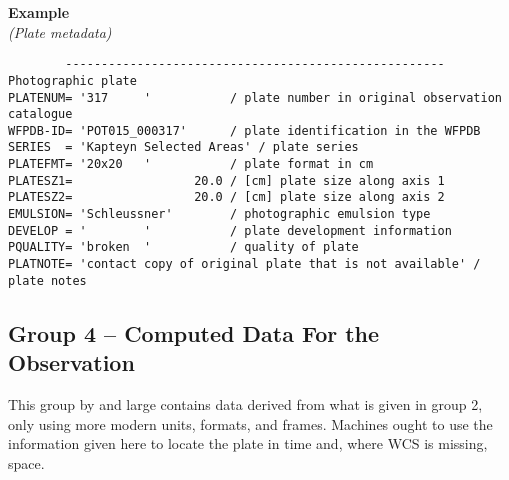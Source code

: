 \documentclass[11pt]{ivoa}
\newenvironment{fitsexample}[1]
{\bigskip\noindent\textbf{Example}\\\textit{(#1)\smallskip}}
{\medskip}
\begin{document}
\begin{fitsexample}{Plate metadata}
\begin{lstlisting}
        ----------------------------------------------------- Photographic plate
PLATENUM= '317     '           / plate number in original observation catalogue
WFPDB-ID= 'POT015_000317'      / plate identification in the WFPDB
SERIES  = 'Kapteyn Selected Areas' / plate series
PLATEFMT= '20x20   '           / plate format in cm
PLATESZ1=                 20.0 / [cm] plate size along axis 1
PLATESZ2=                 20.0 / [cm] plate size along axis 2
EMULSION= 'Schleussner'        / photographic emulsion type
DEVELOP = '        '           / plate development information
PQUALITY= 'broken  '           / quality of plate
PLATNOTE= 'contact copy of original plate that is not available' / plate notes
\end{lstlisting}
\end{fitsexample}

\subsection{Group 4 – Computed Data For the Observation}

This group by and large contains data derived from what is given in
group 2, only using more modern units, formats, and frames.  Machines
ought to use the information given here to locate the plate in time and,
where WCS is missing, space.
\end{document}
